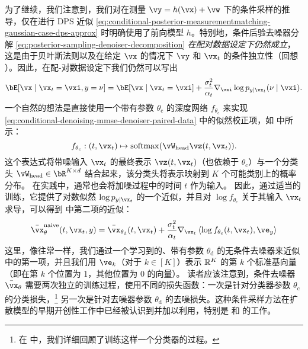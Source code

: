 \documentclass[../../book-main.tex]{subfiles}
\begin{document}
为了继续，我们注意到，我们对在测量 $\vy = h(\vx) + \vw$ 下的条件采样的推导，仅在进行 DPS 近似 \eqref{eq:conditional-posterior-measurementmatching-gaussian-case-dps-approx} 时明确使用了前向模型 $h$。特别地，条件后验去噪器分解 \eqref{eq:posterior-sampling-denoiser-decomposition} \textit{在配对数据设定下仍然成立}，这是由于贝叶斯法则以及在给定 $\vx$ 的情况下 $\vy$ 和 $\vx_t$ 的条件独立性（回想 ）。因此，在配-对数据设定下我们仍然可以写出
\begin{equation}\label{eq:conditional-denoising-mmse-denoiser-paired-data}
  \bE[ \vx \mid \vx_t=\vxi, y=\nu]
  =
  \bE[\vx \mid \vx_t=\vxi] 
  + \frac{\sigma_t^2}{\alpha_t} 
  \nabla_{\vxi}\log p_{y \mid \vx_t}(\nu\mid \vxi).
\end{equation}
一个自然的想法是直接使用一个带有参数 $\theta_{\mathrm{c}}$ 的深度网络 $f_{\theta_{\mathrm{c}}}$ 来实现 \eqref{eq:conditional-denoising-mmse-denoiser-paired-data} 中的似然校正项，如  中所示：
\begin{equation}
  f_{\theta_{\mathrm{c}}} : (t, \vx_t) \mapsto \softmax(\vW_{\mathrm{head}}
  \vz(t, \vx_t)).
\end{equation}
这个表达式将带噪输入 $\vx_t$ 的最终表示 $\vz(t, \vx_t)$（也依赖于 $\theta_{\mathrm{c}}$）与一个分类头 $\vW_{\mathrm{head}} \in \bR^{K \times d}$ 结合起来，该分类头将表示映射到 $K$ 个可能类别上的概率分布。
在实践中，通常也会将加噪过程中的时间 $t$ 作为输入。
因此，通过适当的训练，它提供了对数似然 $\log p_{y \mid \vx_t}$ 的一个近似，并且对 $\log f_{\theta_{\mathrm{c}}}$ 关于其输入 $\vx_t$ 求导，可以得到  中第二项的近似：
\begin{equation}\label{eq:conditional-denoising-mmse-denoiser-paired-data-approx}
  \bar{\vx}_{\theta}^{\mathrm{naive}}(t, \vx_t, y)
  =
  \bar{\vx}_{\theta_{\mathrm{d}}}(t, \vx_t)
  + \frac{\sigma_t^2}{\alpha_t}
  \nabla_{\vx_t}
  \ip*{
    \log f_{\theta_{\mathrm{c}}}(t, \vx_t)
  }{
    \ve_{y}
  }
\end{equation}
这里，像往常一样，我们通过一个学习到的、带有参数 $\theta_{\mathrm{d}}$ 的无条件去噪器来近似  中的第一项，并且我们用 $\ve_k$（对于 $k \in [K]$）表示 $\mathbb{R}^K$ 的第 $k$ 个标准基向量（即在第 $k$ 个位置为 1，其他位置为 0 的向量）。
读者应该注意到，条件去噪器 $\bar{\vx}_{\theta}$ 需要两次独立的训练过程，使用不同的损失函数：一次是针对分类器参数 $\theta_{\mathrm{c}}$ 的分类损失，\footnote{在  中，我们详细回顾了训练这样一个分类器的过程。} 另一次是针对去噪器参数 $\theta_{\mathrm{d}}$ 的去噪损失。这种条件采样方法在扩散模型的早期开创性工作中已经被认识到并加以利用，特别是 \citet{Sohl-Dickstein2015} 和 \citet{song2020score} 的工作。
\end{document}
